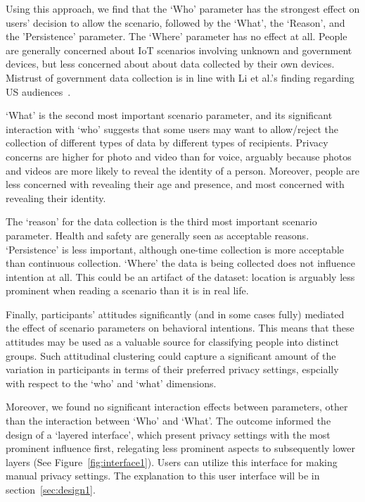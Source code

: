 Using this approach, we find that the `Who' parameter has the strongest effect on users' decision to allow the scenario, followed by the `What', the `Reason', and the 'Persistence' parameter. The `Where' parameter has no effect at all. People are generally concerned about IoT scenarios involving unknown and government devices, but less concerned about about data collected by their own devices. Mistrust of government data collection is in line with Li et al.'s finding regarding US audiences~\cite{li2017cross}.

`What' is the second most important scenario parameter, and its significant interaction with `who' suggests that some users may want to allow/reject the collection of different types of data by different types of recipients. Privacy concerns are higher for photo and video than for voice, arguably because photos and videos are more likely to reveal the identity of a person. Moreover, people are less concerned with revealing their age and presence, and most concerned with revealing their identity.

The `reason' for the data collection is the third most important scenario parameter. Health and safety are generally seen as acceptable reasons. `Persistence' is less important, although one-time collection is more acceptable than continuous collection. `Where' the data is being collected does not influence intention at all. This could be an artifact of the dataset: location is arguably less prominent when reading a scenario than it is in real life.

Finally, participants' attitudes significantly (and in some cases fully) mediated the effect of scenario parameters on behavioral intentions. This means that these attitudes may be used as a valuable source for classifying people into distinct groups. Such attitudinal clustering could capture a significant amount of the variation in participants in terms of their preferred privacy settings, espcially with respect to the `who' and `what' dimensions.

Moreover, we found no significant interaction effects between parameters, other than the interaction between `Who' and `What'. The outcome informed the design of a `layered interface', which present privacy settings with the most prominent influence first, relegating less prominent aspects to subsequently lower layers (See Figure~\ref{fig:interface1}). Users can utilize this interface for making manual privacy settings. The explanation to this user interface will be in section~\ref{sec:design1}.

